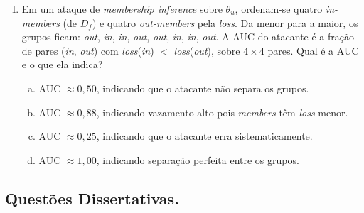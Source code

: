 \documentclass{dlproblemset}
\begin{document}
\begin{enumerate}[I)]
    \item {} Em um ataque de \textit{membership inference} sobre $\theta_u$, ordenam-se quatro \textit{in-members} (de $D_f$) e quatro \textit{out-members} pela \textit{loss}. Da menor para a maior, os grupos ficam: \textit{out}, \textit{in}, \textit{in}, \textit{out}, \textit{out}, \textit{in}, \textit{in}, \textit{out}. A AUC do atacante é a fração de pares (\textit{in}, \textit{out}) com \textit{loss}(\textit{in}) $<$ \textit{loss}(\textit{out}), sobre $4\times 4$ pares. Qual é a AUC e o que ela indica?
    \begin{enumerate}[(a)]
        \item AUC $\approx 0{,}50$, indicando que o atacante não separa os grupos.
        \item AUC $\approx 0{,}88$, indicando vazamento alto pois \textit{members} têm \textit{loss} menor.
        \item AUC $\approx 0{,}25$, indicando que o atacante erra sistematicamente.
        \item AUC $\approx 1{,}00$, indicando separação perfeita entre os grupos.
    \end{enumerate}

\end{enumerate}

\subsection*{Questões Dissertativas.}
\end{document}
